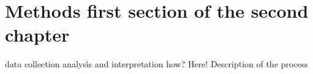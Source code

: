 \section{Methods first section of the second chapter}
data collection analysis and interpretation how? Here!
Description of the process

%
%
%
%
